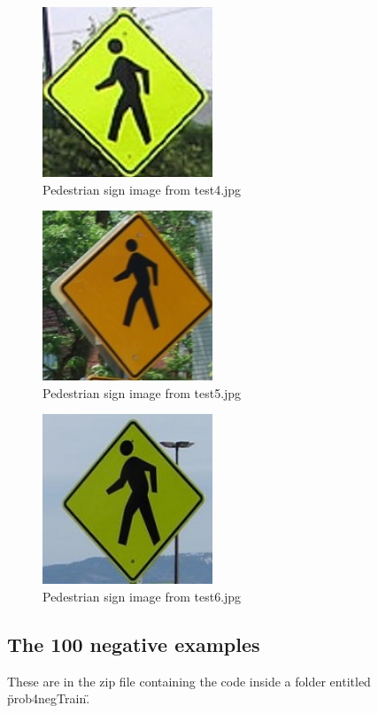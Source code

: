 \documentclass[11pt,psfig]{article}
\begin{document}
\begin{figure}[H]
\centering
\includegraphics[height=2in]{prob4posTrain/test4train.jpg}
\caption{Pedestrian sign image from test4.jpg}
\end{figure}

\begin{figure}[H]
\centering
\includegraphics[height=2in]{prob4posTrain/test5train.jpg}
\caption{Pedestrian sign image from test5.jpg}
\end{figure}

\begin{figure}[H]
\centering
\includegraphics[height=2in]{prob4posTrain/test6train.jpg}
\caption{Pedestrian sign image from test6.jpg}
\end{figure}

\subsection*{The 100 negative examples}

These are in the zip file containing the code inside a folder entitled \"prob4negTrain\". 
\end{document}
